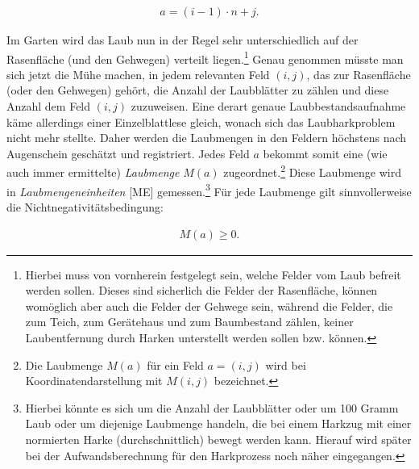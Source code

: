 \documentclass[fontsize=12pt,doubleside,openany,listof=totoc,listof=flat,listof=nochaptergap,numbers=noenddot]{scrbook}
\theoremstyle{style}
\begin{document}
\begin{align}
a=(i-1)\cdot n+j.\label{HJKmlp_equation_Formel1}
\end{align}

\noindent Im Garten wird das Laub nun in der Regel sehr unterschiedlich auf der Rasenfläche (und den Gehwegen) verteilt liegen.\footnote{Hierbei muss von vornherein festgelegt sein, welche Felder vom Laub befreit werden sollen. Dieses sind sicherlich die Felder der Rasenfläche, können womöglich aber auch die Felder der Gehwege sein, während die Felder, die zum Teich, zum Gerätehaus und zum Baumbestand zählen, keiner Laubentfernung durch Harken unterstellt
werden sollen bzw. können.} 
Genau genommen müsste man sich jetzt die Mühe machen, in jedem relevanten Feld $(i,j)$, 
das zur Rasenfläche (oder den Gehwegen) gehört, die Anzahl der Laubblätter zu zählen und 
diese Anzahl dem Feld $(i,j)$ zuzuweisen. Eine derart genaue Laubbestandsaufnahme käme 
allerdings einer Einzelblattlese gleich, wonach sich das Laubharkproblem nicht mehr stellte. 
Daher werden die Laubmengen in den Feldern höchstens nach Augenschein geschätzt 
und registriert. Jedes Feld $a$ bekommt somit eine (wie auch immer ermittelte)
\textit{Laubmenge}\label{Laubmenge} $M(a)$ zugeordnet.\footnote{Die Laubmenge $M(a)$ für ein Feld $a=(i,j)$ wird bei Koordinatendarstellung mit $M(i,j)$ bezeichnet.} Diese
Laubmenge wird in \textit{Laubmengeneinheiten}\label{Laubmengeneinheiten} [ME] gemessen.\footnote{Hierbei könnte es sich um die Anzahl der Laubblätter oder um 100 Gramm Laub oder um diejenige Laubmenge handeln, die bei einem Harkzug mit einer normierten Harke 
(durchschnittlich) bewegt werden kann. Hierauf wird später bei der Aufwandsberechnung 
für den Harkprozess noch näher eingegangen.} Für jede Laubmenge gilt sinnvollerweise 
die Nichtnegativitätsbedingung:

\begin{align}
M(a) \geq 0.\label{HJKmlp_equation_Formel2}
\end{align}
\end{document}
